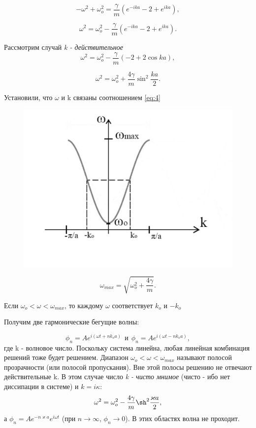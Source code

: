 \begin{equation*}
	-\omega^2+\omega_o^2=\frac{\gamma}{m}(e^{-ika}-2+e^{ika}),
\end{equation*}

\begin{equation}
	\omega^2=\omega_o^2-\frac{\gamma}{m}(e^{-ika}-2+e^{ika}).
	\label{eq:3}
\end{equation}

Рассмотрим случай \textit{k - действительное}
\begin{equation*}
	\omega^2=\omega_o^2-\frac{\gamma}{m}(-2+2\cos{ka}),
\end{equation*}

\begin{equation}
	\omega^2=\omega_o^2+\frac{4\gamma}{m}\sin^2{\frac{ka}{2}}.
	\label{eq:4}
\end{equation}

Установили, что $\omega$ и k связаны соотношением \eqref{eq:4}

\begin{figure}[H]
	\centering
	\includegraphics[width=0.5\linewidth]{fig/fig2.pdf}   
\end{figure}

\begin{equation*}
	\omega_{max}=\sqrt{\omega_o^2+\frac{4\gamma}{m}}.
\end{equation*}

Если $\omega_o < \omega < \omega_{max}$, то каждому $\omega$ соответствует $k_o$ и $-k_o$

Получим две гармонические бегущие волны:

\begin{equation*}
	\phi_n=A e^{i(\omega t+nk_oa)} ~~\text{и} ~~\phi_n=A e^{i(\omega t-nk_oa)},
\end{equation*}
где k - волновое число. Поскольку система линейна, любая линейная комбинация решений тоже будет решением. Диапазон $\omega_o < \omega < \omega_{max}$ называют полосой прозрачности (или полосой пропускания). Вне этой полосы решению не отвечают действительные k. В этом случае число \textit{k - чисто мнимое} (чисто - ибо нет диссипации в системе) и $k=i\kappa$:
\begin{equation}
	\omega^2=\omega_o^2-\frac{4\gamma}{m}\sh^2{\frac{\varkappa a}{2}},
	\label{eq:5}
\end{equation}
а $\phi_n=A e^{-n\varkappa a} e^{i\omega t}$ (при $n\rightarrow \infty$, $\phi_n \rightarrow 0$). В этих областях волна не проходит. 

